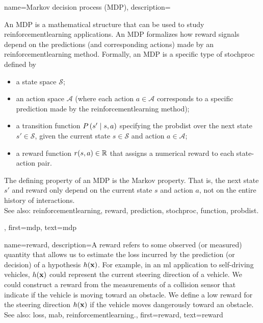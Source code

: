 {name={Markov decision process (MDP)},
	description={An MDP  is a mathematical structure that can 
    		be used to study \gls{reinforcementlearning} applications. An MDP formalizes how \gls{reward} 
		signals depend on the \glspl{prediction} (and corresponding actions) made by an \gls{reinforcementlearning} 
		method. Formally, an MDP is a specific type of \gls{stochproc} defined by
		\begin{itemize}
    			\item a state space $\mathcal{S}$;
    			\item an action space $\mathcal{A}$ (where each action $a \in \mathcal{A}$ corresponds to a specific 
			\gls{prediction} made by the \gls{reinforcementlearning} method);
    			\item a transition \gls{function} $P\left(s' \mid s, a\right)$ specifying the \gls{probdist} over the 
			next state $s' \in \mathcal{S}$, given the current state $s \in \mathcal{S}$ and action $a \in \mathcal{A}$;
    			\item a \gls{reward} \gls{function} $r(s, a) \in \mathbb{R}$ that assigns a numerical \gls{reward} to each 
			state-action pair.
		\end{itemize}
		The defining property of an MDP is the Markov property. That is, the next state $s'$ and \gls{reward} 
		only depend on the current state $s$ and action $a$, not on the entire history of interactions. 
		\\
		See also: \gls{reinforcementlearning}, \gls{reward}, \gls{prediction}, \gls{stochproc}, \gls{function}, \gls{probdist}.},
 	first={mdp},
 	text={mdp} 
 }
 

{name={reward}, 
	description={A reward refers to some observed 
		(or measured) quantity that allows us to estimate the \gls{loss} incurred by the \gls{prediction} 
		(or decision) of a \gls{hypothesis} $h({\bf x})$. For example, in an 
		\gls{ml} application to self-driving vehicles, $h({\bf x})$ could represent 
		the current steering direction of a vehicle. We could construct a reward from the 
		measurements of a collision sensor that indicate if the vehicle is moving toward 
		an obstacle. We define a low reward for the steering direction 
		$h({\bf x})$ if the vehicle moves dangerously toward an obstacle.
			\\
		See also: \gls{loss}, \gls{mab}, \gls{reinforcementlearning}.},
	first={reward}, 
	text={reward}
} 

